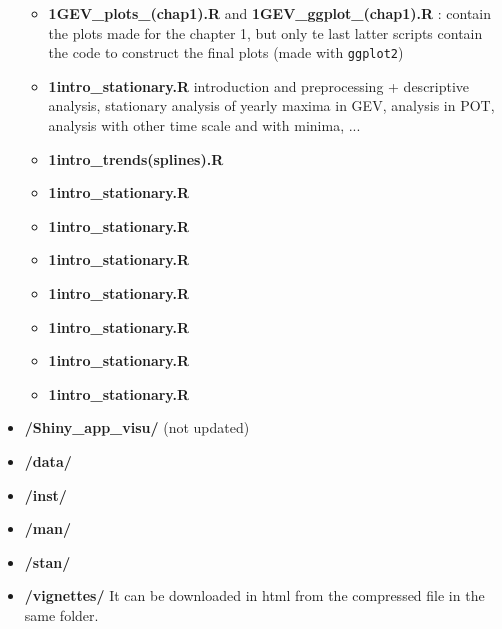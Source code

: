 \begin{itemize}
\begin{itemize}
\item \textbf{1GEV\_plots\_(chap1).R} and \textbf{1GEV\_ggplot\_(chap1).R} : contain the plots made for the chapter 1, but only te last latter scripts contain the code to construct the final plots (made with \texttt{ggplot2})
\item\textbf{1intro\_stationary.R} introduction and preprocessing +  descriptive analysis, stationary analysis of yearly maxima in GEV, analysis in POT, analysis with other time scale and with minima, ...
\item\textbf{1intro\_trends(splines).R} 
\item\textbf{1intro\_stationary.R} 
\item\textbf{1intro\_stationary.R} 
\item\textbf{1intro\_stationary.R} 
\item\textbf{1intro\_stationary.R} 
\item\textbf{1intro\_stationary.R} 
\item\textbf{1intro\_stationary.R} 
\item\textbf{1intro\_stationary.R} 
\end{itemize}


\item \textbf{/Shiny\_app\_visu/} (not updated)
\item \textbf{/data/}
\item \textbf{/inst/}
\item \textbf{/man/}
\item \textbf{/stan/}
\item \textbf{/vignettes/}  It can be downloaded in html from the compressed file in the same folder.
\end{itemize}
